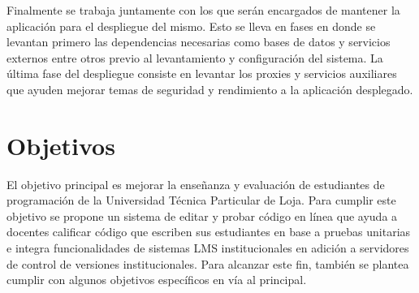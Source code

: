 Finalmente se trabaja juntamente con los que serán encargados de mantener la aplicación para el despliegue del mismo. Esto se lleva en fases en donde se levantan primero las dependencias necesarias como bases de datos y servicios externos entre otros previo al levantamiento y configuración del sistema. La última fase del despliegue consiste en levantar los proxies y servicios auxiliares que ayuden mejorar temas de seguridad y rendimiento a la aplicación desplegado.

\section{Objetivos}
El objetivo principal es mejorar la enseñanza y evaluación de estudiantes de programación de la Universidad Técnica Particular de Loja. Para cumplir este objetivo se propone un sistema de editar y probar código en línea que ayuda a docentes calificar código que escriben sus estudiantes en base a pruebas unitarias e integra funcionalidades de sistemas LMS  institucionales en adición a servidores de control de versiones institucionales. Para alcanzar este fin, también se plantea cumplir con algunos objetivos específicos en vía al principal. 

